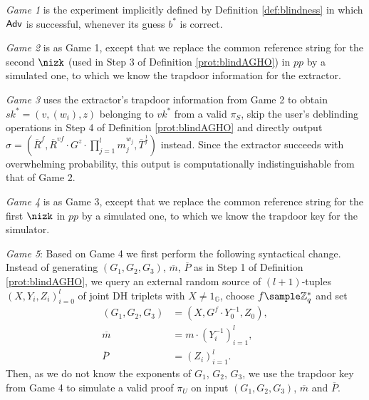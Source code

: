 \begin{description}
\item
\emph{Game 1} is the experiment implicitly defined by Definition \ref{def:blindness} in which $\mathsf{Adv}$ is successful, whenever its guess $b^*$ is correct.

\item
\emph{Game 2} is as Game 1, except that we replace the common reference string for the second $\nizk$ (used in Step 3 of Definition \ref{prot:blindAGHO}) in $pp$ by a simulated one, to which we know  the trapdoor information for the extractor.

\item
\emph{Game 3} uses the extractor's trapdoor information from Game 2 to obtain $sk^*=(v,(w_i),z)$ belonging to $vk^*$ from a valid $\pi_S$, skip the user's deblinding operations in Step 4 of Definition \ref{prot:blindAGHO} and directly output $\sigma = (\overline R^f, \overline R^{vf} \cdot G^z\cdot \prod_{j=1}^l m_j^{w_j}, \overline T^\frac{1}{f})$ instead.
Since the extractor succeeds with overwhelming probability, this output is computationally indistinguishable from that of Game 2.

\item
\emph{Game 4} is as Game 3, except that we replace the common reference string for the first $\nizk$ in $pp$ by a simulated one, to which we know  the trapdoor key for the simulator.

\item
\emph{Game 5}:
Based on Game 4 we first perform the following syntactical change.
Instead of generating $(G_1,G_2,G_3)$, $\overline m$, $\overline P$ as in Step 1 of Definition \ref{prot:blindAGHO}, we query an external random source of $(l+1)$-tuples $(X,Y_i,Z_i)_{i=0}^l$ of joint DH triplets with $X\neq 1_\mathbb{G}$, choose $f\sample \Z_q^*$ and set
\begin{align*}
(G_1,G_2,G_3) &= (X, G^f\cdot Y_0^{-1}, Z_0),
\\
\overline m &= m\cdot (Y_i^{-1})_{i=1}^l,
\\
\overline P &= (Z_i)_{i=1}^l.
\end{align*} 
Then, as we do not know the exponents of $G_1$, $G_2$, $G_3$, we use the trapdoor key from Game 4 to 
simulate a valid proof $\pi_U$ on input $(G_1,G_2,G_3)$, $\overline m$ and $\overline P$.


\end{description}
